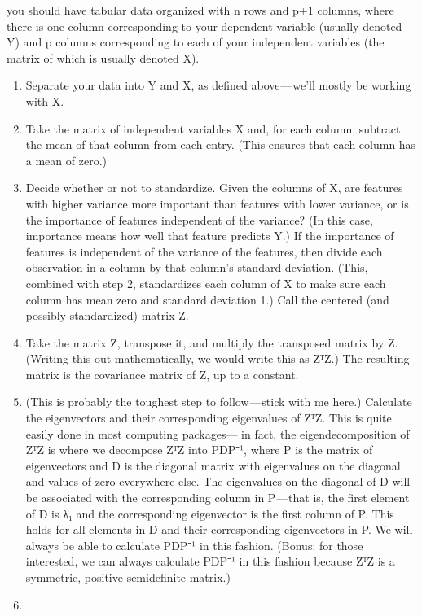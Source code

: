 \documentclass[
]{book}
\begin{document}
you should have tabular data organized with n rows and p+1 columns, where there is one column corresponding to your dependent variable (usually denoted Y) and p columns corresponding to each of your independent variables (the matrix of which is usually denoted X).

\begin{enumerate}
\def\labelenumi{\arabic{enumi})}
\item
  Separate your data into Y and X, as defined above --- we'll mostly be working with X.
\item
  Take the matrix of independent variables X and, for each column, subtract the mean of that column from each entry. (This ensures that each column has a mean of zero.)
\item
  Decide whether or not to standardize. Given the columns of X, are features with higher variance more important than features with lower variance, or is the importance of features independent of the variance? (In this case, importance means how well that feature predicts Y.) If the importance of features is independent of the variance of the features, then divide each observation in a column by that column's standard deviation. (This, combined with step 2, standardizes each column of X to make sure each column has mean zero and standard deviation 1.) Call the centered (and possibly standardized) matrix Z.
\item
  Take the matrix Z, transpose it, and multiply the transposed matrix by Z. (Writing this out mathematically, we would write this as ZᵀZ.) The resulting matrix is the covariance matrix of Z, up to a constant.
\item
  (This is probably the toughest step to follow --- stick with me here.) Calculate the eigenvectors and their corresponding eigenvalues of ZᵀZ. This is quite easily done in most computing packages--- in fact, the eigendecomposition of ZᵀZ is where we decompose ZᵀZ into PDP⁻¹, where P is the matrix of eigenvectors and D is the diagonal matrix with eigenvalues on the diagonal and values of zero everywhere else. The eigenvalues on the diagonal of D will be associated with the corresponding column in P --- that is, the first element of D is λ₁ and the corresponding eigenvector is the first column of P. This holds for all elements in D and their corresponding eigenvectors in P. We will always be able to calculate PDP⁻¹ in this fashion. (Bonus: for those interested, we can always calculate PDP⁻¹ in this fashion because ZᵀZ is a symmetric, positive semidefinite matrix.)
\item

\end{enumerate}
\end{document}
